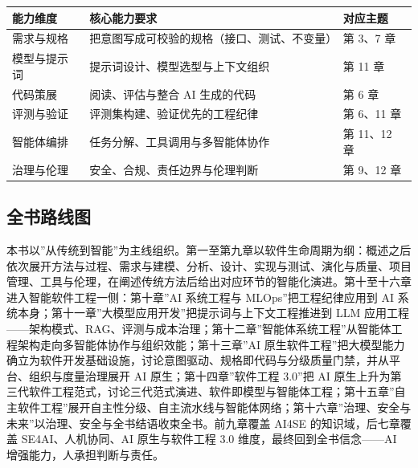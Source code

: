 \documentclass[
]{ctexbook}
\newcounter{none}
\begin{document}
{\def\LTcaptype{none} %
\begin{longtable}[]{@{}
  >{\raggedright\arraybackslash}p{}
  >{\raggedright\arraybackslash}p{}
  >{\raggedright\arraybackslash}p{}@{}}
\toprule\noalign{}
\begin{minipage}[b]{\linewidth}\raggedright
能力维度
\end{minipage} & \begin{minipage}[b]{\linewidth}\raggedright
核心能力要求
\end{minipage} & \begin{minipage}[b]{\linewidth}\raggedright
对应主题
\end{minipage} \\
\midrule\noalign{}
\endhead
\bottomrule\noalign{}
\endlastfoot
需求与规格 & 把意图写成可校验的规格（接口、测试、不变量） & 第 3、7
章 \\
模型与提示词 & 提示词设计、模型选型与上下文组织 & 第 11 章 \\
代码策展 & 阅读、评估与整合 AI 生成的代码 & 第 6 章 \\
评测与验证 & 评测集构建、验证优先的工程纪律 & 第 6、11 章 \\
智能体编排 & 任务分解、工具调用与多智能体协作 & 第 11、12 章 \\
治理与伦理 & 安全、合规、责任边界与伦理判断 & 第 9、12 章 \\
\end{longtable}
}

\subsection{全书路线图}\label{ux5168ux4e66ux8defux7ebfux56fe}

本书以''从传统到智能''为主线组织。第一至第九章以软件生命周期为纲：概述之后依次展开方法与过程、需求与建模、分析、设计、实现与测试、演化与质量、项目管理、工具与伦理，在阐述传统方法后给出对应环节的智能化演进。第十至十六章进入智能软件工程一侧：第十章''AI
系统工程与 MLOps''把工程纪律应用到 AI
系统本身；第十一章''大模型应用开发''把提示词与上下文工程推进到 LLM
应用工程------架构模式、RAG、评测与成本治理；第十二章''智能体系统工程''从智能体工程架构走向多智能体协作与组织效能；第十三章''AI
原生软件工程''把大模型能力确立为软件开发基础设施，讨论意图驱动、规格即代码与分级质量门禁，并从平台、组织与度量治理展开
AI 原生；第十四章''软件工程 3.0''把 AI
原生上升为第三代软件工程范式，讨论三代范式演进、软件即模型与智能体工程；第十五章''自主软件工程''展开自主性分级、自主流水线与智能体网络；第十六章''治理、安全与未来''以治理、安全与全书结语收束全书。前九章覆盖
AI4SE 的知识域，后七章覆盖 SE4AI、人机协同、AI 原生与软件工程 3.0
维度，最终回到全书信念------AI 增强能力，人承担判断与责任。
\end{document}
